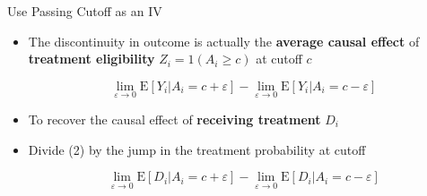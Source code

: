 \documentclass[hyperref={pdfpagelabels=false}]{beamer}
\begin{document}
\begin{frame}{Use Passing Cutoff as an IV}{}
	\begin{itemize}
		
		\item The discontinuity in outcome is actually the \textbf{average causal effect} of \textbf{treatment eligibility} $Z_{i}=1(A_i\geq c)$ at cutoff $c$
		
		\begin{equation}
			\lim_{\varepsilon\rightarrow 0}\mathrm{E}[Y_{i}|A_{i}=c+\varepsilon]-\lim_{\varepsilon\rightarrow 0}\mathrm{E}[Y_{i}|A_{i}=c-\varepsilon]	
		\end{equation}
		
		
		\item To recover the causal effect of \textbf{receiving treatment} $D_{i}$
		\vspace{0.2cm}
		\item Divide (2) by the jump in the treatment probability at cutoff
		
		\begin{equation*}
			\lim_{\varepsilon\rightarrow 0}\mathrm{E}[D_{i}|A_{i}=c+\varepsilon]-\lim_{\varepsilon\rightarrow 0}\mathrm{E}[D_{i}|A_{i}=c-\varepsilon]
		\end{equation*}
		
	\end{itemize}
\end{frame}
\end{document}
